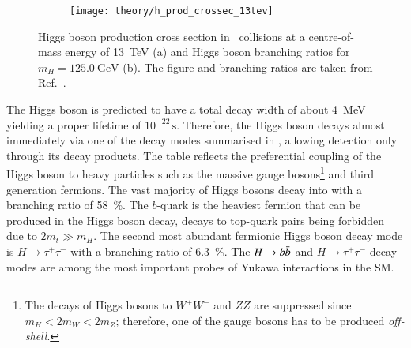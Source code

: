 \begin{figure}[htbp]
  \centering

  \begin{subfigure}[b]{0.47\textwidth}
    \centering

    \texttt{[image: theory/h\_prod\_crossec\_13tev]}

    \label{fig:higgs_prod_xsec}
  \end{subfigure}\hfill%
  \begin{subfigure}[b]{0.47\textwidth}
    \centering

    {
      \renewcommand{\arraystretch}{1.1}%
      
    }

    \vspace*{1.5em}

    \label{tab:higgs_branching_ratios}
  \end{subfigure}

  \caption[Higgs boson production cross section and branching ratios.]{Higgs
    boson production cross section in \pp~collisions at a centre-of-mass energy
    of \SI{13}{\TeV} (a) and Higgs boson branching ratios for
    $m_{H} = \SI{125.0}{\GeV}$ (b). The figure and branching ratios are taken
    from Ref.~\cite{deFlorian:2016spz_book}.}
\end{figure}

The Higgs boson is predicted to have a total decay width of about
\SI{4}{\MeV}~\cite{deFlorian:2016spz_book} yielding a proper lifetime of
$10^{-22}\,\si{\second}$. Therefore, the Higgs boson decays almost immediately
via one of the decay modes summarised in ,
allowing detection only through its decay products. The table reflects the
preferential coupling of the Higgs boson to heavy particles such as the massive
gauge bosons\footnote{The decays of Higgs bosons to $W^+W^-$ and $ZZ$ are
  suppressed since $m_{H} < 2 m_{W} < 2 m_{Z}$; therefore, one of the gauge bosons
  has to be produced \emph{off-shell}.} and third generation fermions. The vast
majority of Higgs bosons decay into \bbbar with a branching ratio of
\SI{58}{\percent}. The $b$-quark is the heaviest fermion that can be produced in
the Higgs boson decay, decays to top-quark pairs being forbidden due to
$2 m_t \gg m_H$. The second most abundant fermionic Higgs boson decay mode is
$H \to \tau^+ \tau^-$ with a branching ratio of \SI{6.3}{\percent}. The
$H \to b\bar{b}$ and $H \to \tau^+ \tau^-$ decay modes are among the most
important probes of Yukawa interactions in the SM.


